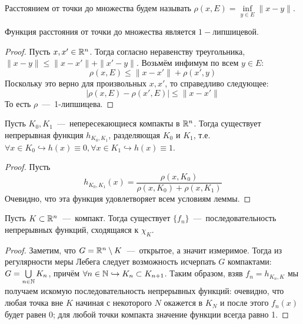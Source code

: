 \begin{reminder}
    Расстоянием от точки до множества будем называть $\rho(x, E) = \inf\limits_{y \in E} \|x - y\|$.
\end{reminder}

\begin{lemma}
    Функция расстояния от точки до множества является $1-$липшицевой.
\end{lemma}
\begin{proof}
    Пусть $x, x' \in \mathbb{R}^n$. Тогда согласно неравенству треугольника, $\|x - y\| \leq \|x - x'\| + \|x' - y\|$.
    Возьмём инфимум по всем $y \in E:$ \[\rho(x, E) \leq \|x - x'\| + \rho(x', y)\]
    Поскольку это верно для произвольных $x, x'$, то справедливо следующее: \[|\rho(x, E) - \rho(x', E)| \leq \|x - x'\|\]
    То есть $\rho$~---~1-липшицева.
\end{proof}

\begin{lemma}
    Пусть $K_0, K_1$~---~непересекающиеся компакты в $\mathbb{R}^n$. Тогда существует непрерывная функция $h_{K_0, K_1}$, разделяющая $K_0$ и $K_1$, т.е. $\forall x \in K_0 \hookrightarrow h(x) \equiv 0, \forall x \in K_1 \hookrightarrow h(x) \equiv 1$.
\end{lemma}
\begin{proof}
    Пусть \[h_{K_0, K_1}(x) = \dfrac{\rho(x, K_0)}{\rho(x, K_0) + \rho(x, K_1)}\]
    Очевидно, что эта функция удовлетворяет всем условиям леммы.
\end{proof}

\begin{theorem}
    Пусть $K \subset \mathbb{R}^n$~---~компакт. Тогда существует $\{f_n\}$~---~последовательность непрерывных функций, сходящаяся к $\chi_K$.
\end{theorem}
\begin{proof}
    Заметим, что $G = \mathbb{R}^n \setminus K$~---~открытое, а значит измеримое. Тогда из регулярности меры Лебега следует возможность исчерпать $G$ компактами: $G = \bigcup\limits_{n \in \mathbb{N}} K_n$, причём $\forall n \in \mathbb{N} \hookrightarrow K_n \subset K_{n + 1}$. Таким образом, взяв $f_n = h_{K_n, K}$ мы получаем искомую последовательность непрерывных функций: очевидно, что любая точка вне $K$ начиная с некоторого $N$ окажется в $K_N$ и после этого $f_n(x)$ будет равен 0; для любой точки компакта значение функции всегда равно 1.
\end{proof}



